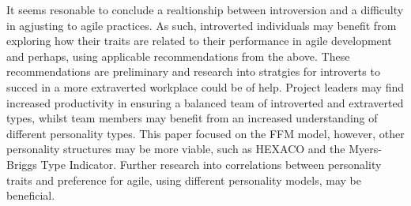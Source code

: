 \documentclass{scrartcl}
\begin{document}
It seems resonable to conclude a realtionship between introversion and a difficulty in agjusting to agile practices. As such, introverted individuals may benefit from exploring how their traits are related to their performance in agile development and perhaps, using applicable recommendations from the above. These recommendations are preliminary and research into stratgies for introverts to succed in a more extraverted workplace could be of help. Project leaders may find increased productivity in ensuring a balanced team of introverted and extraverted types, whilst team members may benefit from an increased understanding of different personality types. This paper focused on the FFM model, however, other personality structures may be more viable, such as HEXACO and the Myers-Briggs Type Indicator. Further research into correlations between personality traits and preference for agile, using different personality models, may be beneficial. 




\end{document}
